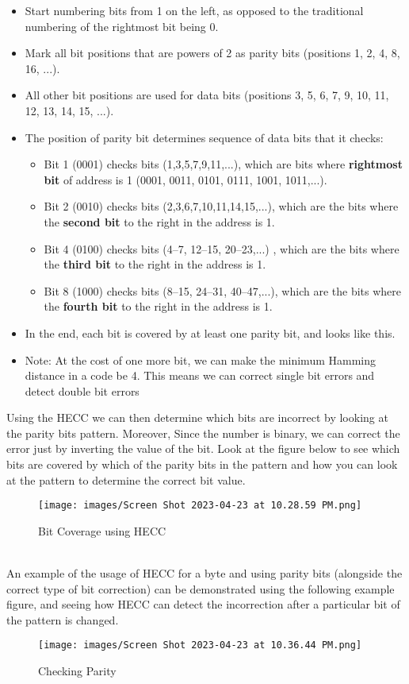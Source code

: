 \documentclass[letterpaper,c12pt]{article}
\begin{document}
\begin{itemize}
    \item Start numbering bits from 1 on the left, as opposed to the traditional numbering of the rightmost bit being 0.
    \item Mark all bit positions that are powers of 2 as parity bits (positions 1, 2, 4, 8, 16, ...).
    \item All other bit positions are used for data bits (positions 3, 5, 6, 7, 9, 10, 11, 12, 13, 14, 15, ...).
    \item The position of parity bit determines sequence of data bits that it checks:
    \begin{itemize}
        \item Bit 1 (0001) checks bits (1,3,5,7,9,11,...), which are bits where \textbf{rightmost bit} of address is 1 (0001, 0011, 0101, 0111, 1001, 1011,...).
        \item Bit 2 (0010) checks bits (2,3,6,7,10,11,14,15,...), which are the bits where the \textbf{second bit} to the right in the address is 1.
        \item Bit 4 (0100) checks bits (4–7, 12–15, 20–23,...) , which are the bits where the \textbf{third bit} to the right in the address is 1.
        \item Bit 8 (1000) checks bits (8–15, 24–31, 40–47,...), which are the bits where the \textbf{fourth bit} to the right in the address is 1.
    \end{itemize}
    \item In the end, each bit is covered by at least one parity bit, and looks like this.
    \item Note: At the cost of one more bit, we can make the minimum Hamming distance in a code be 4. This means we can correct single bit errors and detect double bit errors
\end{itemize}
Using the HECC we can then determine which bits are incorrect by looking at the parity bits pattern. Moreover, Since the number is binary, we can correct the error just by inverting the value of the bit. Look at the figure below to see which bits are covered by which of the parity bits in the pattern and how you can look at the pattern to determine the correct bit value.\\
\begin{figure}
    \centering
    \texttt{[image: images/Screen Shot 2023-04-23 at 10.28.59 PM.png]}
    \caption{Bit Coverage using HECC}
    \label{fig:my_label}
\end{figure}\\
An example of the usage of HECC for a byte and using parity bits (alongside the correct type of bit correction) can be demonstrated using the following example figure, and seeing how HECC can detect the incorrection after a particular bit of the pattern is changed.\\
\begin{figure}
    \centering
    \texttt{[image: images/Screen Shot 2023-04-23 at 10.36.44 PM.png]}
    \caption{Checking Parity}
    \label{fig:parity}
\end{figure}
\end{document}

